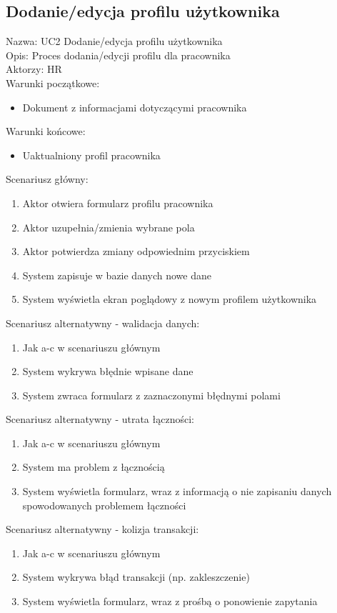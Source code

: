 \subsection{Dodanie/edycja profilu użytkownika}
Nazwa: UC2 Dodanie/edycja profilu użytkownika \\
Opis: Proces dodania/edycji profilu dla pracownika \\
Aktorzy: HR \\
Warunki początkowe:
\begin{itemize}
\item Dokument z informacjami dotyczącymi pracownika
\end{itemize}
Warunki końcowe: 
\begin{itemize}
\item Uaktualniony profil pracownika
\end{itemize}
Scenariusz główny:
\begin{enumerate}
\item Aktor otwiera formularz profilu pracownika
\item Aktor uzupełnia/zmienia wybrane pola
\item Aktor potwierdza zmiany odpowiednim przyciskiem
\item System zapisuje w bazie danych nowe dane
\item System wyświetla ekran poglądowy z nowym profilem użytkownika
\end{enumerate}
Scenariusz alternatywny - walidacja danych: 
\begin{enumerate}
\item Jak a-c w scenariuszu głównym
\item System wykrywa błędnie wpisane dane 
\item System zwraca formularz z zaznaczonymi błędnymi polami
\end{enumerate}
Scenariusz alternatywny - utrata łączności: 
\begin{enumerate}
\item Jak a-c w scenariuszu głównym
\item System ma problem z łącznością 
\item System wyświetla formularz, wraz z informacją o nie zapisaniu danych spowodowanych problemem łączności
\end{enumerate}
Scenariusz alternatywny - kolizja transakcji: 
\begin{enumerate}
\item Jak a-c w scenariuszu głównym
\item System wykrywa błąd transakcji (np. zakleszczenie)
\item System wyświetla formularz, wraz z prośbą o ponowienie zapytania
\end{enumerate}

